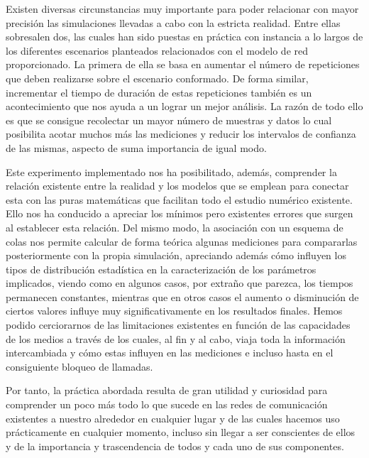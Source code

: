 \documentclass{article}[10pt]
\begin{document}
		Existen diversas circunstancias muy importante para poder relacionar con mayor precisión las simulaciones llevadas a cabo con la estricta realidad. Entre ellas sobresalen dos, las cuales han sido puestas en práctica con instancia a lo largos de los diferentes escenarios planteados relacionados con el modelo de red proporcionado. La primera de ella se basa en aumentar el número de repeticiones que deben realizarse sobre el escenario conformado. De forma similar, incrementar el tiempo de duración de estas repeticiones también es un acontecimiento que nos ayuda a un lograr un mejor análisis. La razón de todo ello es que se consigue recolectar un mayor número de muestras y datos lo cual posibilita acotar muchos más las mediciones y reducir los intervalos de confianza de las mismas, aspecto de suma importancia de igual modo.

		Este experimento implementado nos ha posibilitado, además, comprender la relación existente entre la realidad y los modelos que se emplean para conectar esta con las puras matemáticas que facilitan todo el estudio numérico existente. Ello nos ha conducido a apreciar los mínimos pero existentes errores que surgen al establecer esta relación. Del mismo modo, la asociación con un esquema de colas nos permite calcular de forma teórica algunas mediciones para compararlas posteriormente con la propia simulación, apreciando además cómo influyen los tipos de distribución estadística en la caracterización de los parámetros implicados, viendo como en algunos casos, por extraño que parezca, los tiempos permanecen constantes, mientras que en otros casos el aumento o disminución de ciertos valores influye muy significativamente en los resultados finales. Hemos podido cerciorarnos de las limitaciones existentes en función de las capacidades de los medios a través de los cuales, al fin y al cabo, viaja toda la información intercambiada y cómo estas influyen en las mediciones e incluso hasta en el consiguiente bloqueo de llamadas.

		Por tanto, la práctica abordada resulta de gran utilidad y curiosidad para comprender un poco más todo lo que sucede en las redes de comunicación existentes a nuestro alrededor en cualquier lugar y de las cuales hacemos uso prácticamente en cualquier momento, incluso sin llegar a ser conscientes de ellos y de la importancia y trascendencia de todos y cada uno de sus componentes.
\end{document}
